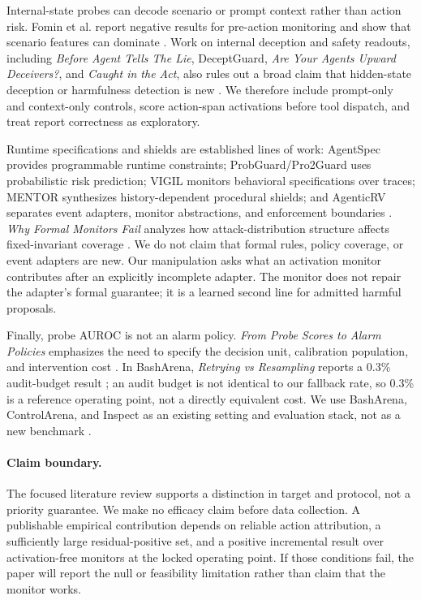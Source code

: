 \documentclass[11pt]{article}
\begin{document}
Internal-state probes can decode scenario or prompt context rather than action risk. Fomin et al. report negative results for pre-action monitoring and show that scenario features can dominate \cite{fominnegative}. Work on internal deception and safety readouts, including \emph{Before Agent Tells The Lie}, DeceptGuard, \emph{Are Your Agents Upward Deceivers?}, and \emph{Caught in the Act}, also rules out a broad claim that hidden-state deception or harmfulness detection is new \cite{beforelie,deceptguard,upward,caught}. We therefore include prompt-only and context-only controls, score action-span activations before tool dispatch, and treat report correctness as exploratory.

Runtime specifications and shields are established lines of work: AgentSpec provides programmable runtime constraints; ProbGuard/Pro2Guard uses probabilistic risk prediction; VIGIL monitors behavioral specifications over traces; MENTOR synthesizes history-dependent procedural shields; and AgenticRV separates event adapters, monitor abstractions, and enforcement boundaries \cite{agentspec,probguard,vigil,mentor,agenticrv}. \emph{Why Formal Monitors Fail} analyzes how attack-distribution structure affects fixed-invariant coverage \cite{whyformal}. We do not claim that formal rules, policy coverage, or event adapters are new. Our manipulation asks what an activation monitor contributes after an explicitly incomplete adapter. The monitor does not repair the adapter's formal guarantee; it is a learned second line for admitted harmful proposals.

Finally, probe AUROC is not an alarm policy. \emph{From Probe Scores to Alarm Policies} emphasizes the need to specify the decision unit, calibration population, and intervention cost \cite{alarm}. In BashArena, \emph{Retrying vs Resampling} reports a 0.3\% audit-budget result \cite{retrying}; an audit budget is not identical to our fallback rate, so 0.3\% is a reference operating point, not a directly equivalent cost. We use BashArena, ControlArena, and Inspect as an existing setting and evaluation stack, not as a new benchmark \cite{basharena,basharenadocs,controlarena,inspect}.

\paragraph{Claim boundary.}
The focused literature review supports a distinction in target and protocol, not a priority guarantee. We make no efficacy claim before data collection. A publishable empirical contribution depends on reliable action attribution, a sufficiently large residual-positive set, and a positive incremental result over activation-free monitors at the locked operating point. If those conditions fail, the paper will report the null or feasibility limitation rather than claim that the monitor works.
\end{document}

